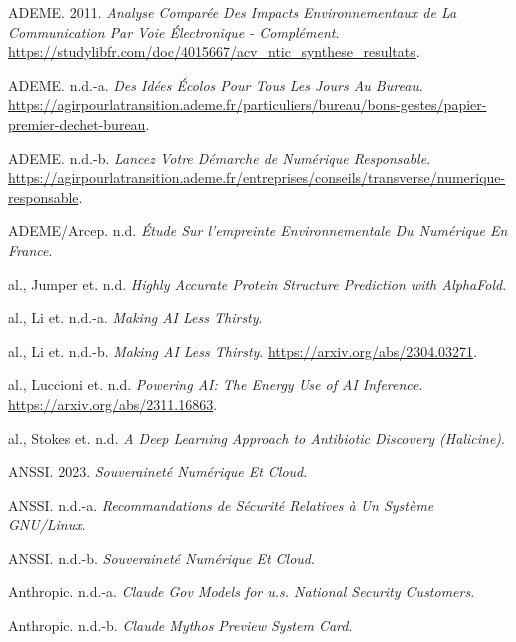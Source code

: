 \documentclass[
  10pt,
  a4paper,
  DIV=11,
  numbers=noendperiod,
  oneside]{scrreprt}
\newlength{\cslhangindent}
\newenvironment{CSLReferences}[2] %
 {\begin{list}{}{%
  \setlength{\itemindent}{0pt}
  \setlength{\leftmargin}{0pt}
  \setlength{\parsep}{0pt}
  \ifodd #1
   \setlength{\leftmargin}{\cslhangindent}
   \setlength{\itemindent}{-1\cslhangindent}
  \fi
  \setlength{\itemsep}{#2\baselineskip}}}
 {\end{list}}
\let\oldemph\emph
\renewcommand{\emph}[1]{\oldemph{\textcolor{cmmgray}{#1}}}
\begin{document}
\protect{}\label{refs}
\begin{CSLReferences}{1}{1}
ADEME. 2011. \emph{Analyse Comparée Des Impacts Environnementaux de La
Communication Par Voie Électronique - Complément}.
\url{https://studylibfr.com/doc/4015667/acv_ntic_synthese_resultats}.

ADEME. n.d.-a. \emph{Des Idées Écolos Pour Tous Les Jours Au Bureau}.
\url{https://agirpourlatransition.ademe.fr/particuliers/bureau/bons-gestes/papier-premier-dechet-bureau}.

ADEME. n.d.-b. \emph{Lancez Votre Démarche de Numérique Responsable}.
\url{https://agirpourlatransition.ademe.fr/entreprises/conseils/transverse/numerique-responsable}.

ADEME/Arcep. n.d. \emph{Étude Sur l'empreinte Environnementale Du
Numérique En France}.

{al., Jumper et}. n.d. \emph{Highly Accurate Protein Structure
Prediction with AlphaFold}.

{al., Li et}. n.d.-a. \emph{Making AI Less Thirsty}.

{al., Li et}. n.d.-b. \emph{Making AI Less Thirsty}.
\url{https://arxiv.org/abs/2304.03271}.

{al., Luccioni et}. n.d. \emph{Powering AI: The Energy Use of AI
Inference}. \url{https://arxiv.org/abs/2311.16863}.

{al., Stokes et}. n.d. \emph{A Deep Learning Approach to Antibiotic
Discovery (Halicine)}.

ANSSI. 2023. \emph{Souveraineté Numérique Et Cloud}.

ANSSI. n.d.-a. \emph{Recommandations de Sécurité Relatives à Un Système
GNU/Linux}.

ANSSI. n.d.-b. \emph{Souveraineté Numérique Et Cloud}.

Anthropic. n.d.-a. \emph{Claude Gov Models for u.s. National Security
Customers}.

Anthropic. n.d.-b. \emph{Claude Mythos Preview System Card}.


\end{CSLReferences}
\end{document}
